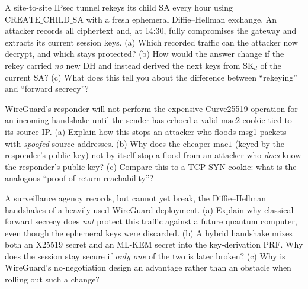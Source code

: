 \begin{exercise}
A site-to-site IPsec tunnel rekeys its child SA every hour using \(\mathrm{CREATE\_CHILD\_SA}\) with a fresh ephemeral Diffie--Hellman exchange. An attacker records all ciphertext and, at 14:30, fully compromises the gateway and extracts its current session keys. (a) Which recorded traffic can the attacker now decrypt, and which stays protected? (b) How would the answer change if the rekey carried \emph{no} new DH and instead derived the next keys from \(\mathrm{SK}_d\) of the current SA? (c) What does this tell you about the difference between ``rekeying'' and ``forward secrecy''?
\end{exercise}

\begin{exercise}
WireGuard's responder will not perform the expensive Curve25519 operation for an incoming handshake until the sender has echoed a valid \(\mathrm{mac2}\) cookie tied to its source IP. (a) Explain how this stops an attacker who floods msg1 packets with \emph{spoofed} source addresses. (b) Why does the cheaper \(\mathrm{mac1}\) (keyed by the responder's public key) not by itself stop a flood from an attacker who \emph{does} know the responder's public key? (c) Compare this to a TCP SYN cookie: what is the analogous ``proof of return reachability''?
\end{exercise}

\begin{exercise}
A surveillance agency records, but cannot yet break, the Diffie--Hellman handshakes of a heavily used WireGuard deployment. (a) Explain why classical forward secrecy does \emph{not} protect this traffic against a future quantum computer, even though the ephemeral keys were discarded. (b) A hybrid handshake mixes both an X25519 secret and an ML-KEM secret into the key-derivation PRF. Why does the session stay secure if \emph{only one} of the two is later broken? (c) Why is WireGuard's no-negotiation design an advantage rather than an obstacle when rolling out such a change?
\end{exercise}
